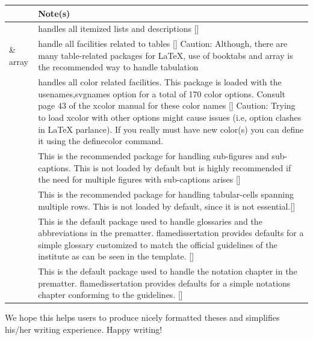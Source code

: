 \begin{table}
\centering
\begin{tabular}{>{\ttfamily}l p{}}
\toprule
{\rmfamily Package(s)} & Note(s) \\
\midrule
{enumitem}
    &
handles all itemized lists and descriptions
[\cite{enumitem}] \\

{booktabs} \& {array}
    &
handle all facilities related to tables [\cite{booktabs,array}]
\newline
{Caution: } Although, there are many table-related packages for {\LaTeX},
use of {booktabs} and {array} is the recommended way to handle
tabulation \\

{xcolor}
    &
handles all color related facilities. This package is loaded with the
{usenames,svgnames} option for a total of 170 color options. Consult page
43 of the {xcolor} manual for these color names [\cite{xcolor}]
\newline
{Caution: } Trying to load {xcolor} with other options might cause
issues (i.e, option clashes in {\LaTeX} parlance). If you really must have new
color(s) you can define it using the {definecolor} command. \\

{subcaption}
    &
This is the recommended package for handling sub-figures and
sub-captions. This is not loaded by default but is highly recommended if the
need for multiple figures with sub-captions arises [\cite{subcaption}] \\

{multirow}
    &
This is the recommended package for handling tabular-cells spanning multiple
rows. This is not loaded by default, since it is not
essential.[\cite{multirow}] \\

{glossaries}
    &
This is the default package used to handle glossaries and the abbreviations in
the prematter. {\ttfamily flamedissertation} provides defaults for a simple glossary
customized to match the official guidelines of the institute as can be seen in
the template. [\cite{glossaries}] \\

{nomencl}
    &
This is the default package used to handle the notation chapter in the
prematter. {\ttfamily flamedissertation} provides defaults for a simple notations
chapter conforming to the guidelines. [\cite{nomencl}] \\
\bottomrule
\end{tabular}
\end{table}

We hope this helps users to produce nicely formatted theses and simplifies his/her 
writing experience. Happy writing!